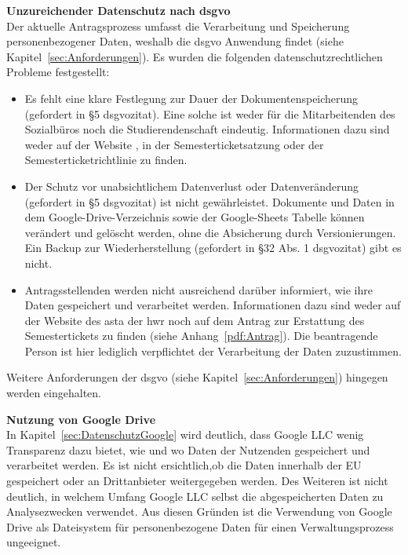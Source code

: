 \textbf{Unzureichender Datenschutz nach \gls{dsgvo}}\\
Der aktuelle Antragsprozess umfasst die Verarbeitung und Speicherung personenbezogener Daten, weshalb die \gls{dsgvo} Anwendung findet (siehe Kapitel~\ref{sec:Anforderungen}). Es wurden die folgenden datenschutzrechtlichen Probleme festgestellt:  
    \begin{itemize}
    \item Es fehlt eine klare Festlegung zur Dauer der Dokumentenspeicherung (gefordert in §5 \gls{dsgvozitat}). Eine solche ist weder für die Mitarbeitenden des Sozialbüros noch die Studierendenschaft eindeutig. Informationen dazu sind weder auf der Website ,  in der Semesterticketsatzung  oder der Semesterticketrichtlinie   zu finden.
    \item Der Schutz vor unabsichtlichem Datenverlust oder Datenveränderung (gefordert in §5 \gls{dsgvozitat}) ist nicht gewährleistet. Dokumente und Daten in dem Google-Drive-Verzeichnis sowie der Google-Sheets Tabelle können verändert und gelöscht werden, ohne die Absicherung durch Versionierungen. Ein Backup zur Wiederherstellung (gefordert in §32 Abs. 1 \gls{dsgvozitat}) gibt es nicht. 
    \item Antragsstellenden werden nicht ausreichend darüber informiert, wie ihre Daten gespeichert und verarbeitet werden. Informationen dazu sind weder auf der Website des \gls{asta} der \gls{hwr}  noch auf dem Antrag zur Erstattung des Semestertickets zu finden (siehe Anhang~\ref{pdf:Antrag}). Die beantragende Person ist hier lediglich verpflichtet der Verarbeitung der Daten zuzustimmen.
    \end{itemize} 
Weitere Anforderungen der \gls{dsgvo} (siehe Kapitel~\ref{sec:Anforderungen}) hingegen werden eingehalten.

\textbf{Nutzung von Google Drive}\\
In Kapitel~\ref{sec:DatenschutzGoogle} wird deutlich, dass Google LLC wenig Transparenz dazu bietet, wie und wo Daten der Nutzenden gespeichert und verarbeitet werden. Es ist nicht ersichtlich,ob die Daten innerhalb der EU gespeichert oder an Drittanbieter weitergegeben werden. Des Weiteren ist nicht deutlich, in welchem Umfang Google LLC selbst die abgespeicherten Daten zu Analysezwecken verwendet. Aus diesen Gründen ist die Verwendung von Google Drive als Dateisystem für personenbezogene Daten für einen Verwaltungsprozess ungeeignet.


